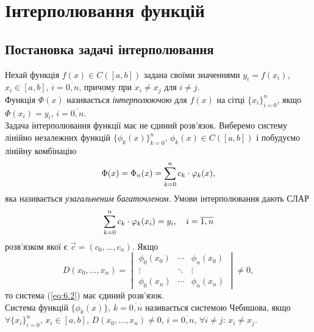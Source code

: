 \section{Інтерполювання функцій}

\subsection{Постановка задачі інтерполювання}

Нехай функція $f(x) \in C([a,b])$ задана своїми значеннями $y_i = f(x_i)$, $x_i \in [a,b]$, $i = \overline{0,n}$, причому при $x_i \ne x_j$ для $i \ne j$. \\

Функція $\Phi(x)$ називається \textit{інтерполюючою} для $f(x)$ на сітці $\{x_i\}_{i=0}^n$, якщо $\Phi(x_i) = y_i$, $i = \overline{0,n}$. \\

Задача інтерполювання функції має не єдиний розв'язок. Виберемо систему лінійно незалежних функцій $\{\phi_k(x)\}_{k=0}^n$, $\phi_k(x) \in C([a,b])$ і побудуємо лінійну комбінацію
\begin{equation}
    \label{eq:6.1}
    \Phi(x) = \Phi_n(x) = \displaystyle\sum\limits_{k=0}^n c_k \cdot \varphi_k(x),
\end{equation}
яка називається \textit{узагальненим багаточленом}. Умови інтерполювання дають СЛАР
\begin{equation}
    \label{eq:6.2}
    \displaystyle\sum\limits_{k=0}^n c_k \cdot \varphi_k(x_i) = y_i, \quad i = \overline{1, n}
\end{equation}
розв'язком якої є $\vec c = (c_0, \ldots, c_n)$. Якщо
\[ D(x_0, \ldots, x_n) = \begin{vmatrix} \phi_0(x_0) & \cdots & \phi_n(x_0) \\ \vdots & \ddots & \vdots \\ \phi_0(x_n) & \cdots & \phi_n(x_n) \end{vmatrix} \ne 0, \]
то система (\ref{eq:6.2}) має єдиний розв'язок. \\

Система функцій $\{\phi_k (x)\}$, $k = \overline{0,n}$ називається системою Чебишова, якщо $\forall \{x_i\}_{i=0}^n$, $x_i\in[a,b]$, $D(x_0, \ldots, x_n)\ne 0$, $i=\overline{0,n}$, $\forall i \ne j$: $x_i \ne x_j$. \\


